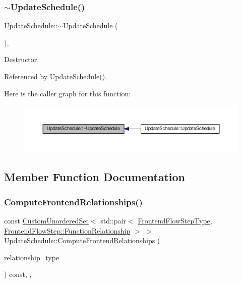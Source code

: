 \subsubsection{\texorpdfstring{$\sim$\+Update\+Schedule()}{~UpdateSchedule()}}
{\footnotesize\ttfamily Update\+Schedule\+::$\sim$\+Update\+Schedule (\begin{DoxyParamCaption}{ }\end{DoxyParamCaption})\hspace{0.3cm}{\ttfamily [override]}, {\ttfamily [default]}}



Destructor. 



Referenced by Update\+Schedule().

Here is the caller graph for this function\+:
\nopagebreak
\begin{figure}[H]
\begin{center}
\leavevmode
\includegraphics[width=350pt]{d2/de3/classUpdateSchedule_a8eaeedb09571da61efac4a8a46213930_icgraph}
\end{center}
\end{figure}


\subsection{Member Function Documentation}
\mbox{\label{classUpdateSchedule_a52731ffff5c21bc62273d3dd77766eb4}} 
\subsubsection{\texorpdfstring{Compute\+Frontend\+Relationships()}{ComputeFrontendRelationships()}}
{\footnotesize\ttfamily const \hyperlink{classCustomUnorderedSet}{Custom\+Unordered\+Set}$<$ std\+::pair$<$ \hyperlink{frontend__flow__step_8hpp_afeb3716c693d2b2e4ed3e6d04c3b63bb}{Frontend\+Flow\+Step\+Type}, \hyperlink{classFrontendFlowStep_af7cf30f2023e5b99e637dc2058289ab0}{Frontend\+Flow\+Step\+::\+Function\+Relationship} $>$ $>$ Update\+Schedule\+::\+Compute\+Frontend\+Relationships (\begin{DoxyParamCaption}\item[{const \hyperlink{classDesignFlowStep_a723a3baf19ff2ceb77bc13e099d0b1b7}{Design\+Flow\+Step\+::\+Relationship\+Type}}]{relationship\+\_\+type }\end{DoxyParamCaption}) const\hspace{0.3cm}{\ttfamily [override]}, {\ttfamily [protected]}, {\ttfamily [virtual]}}



